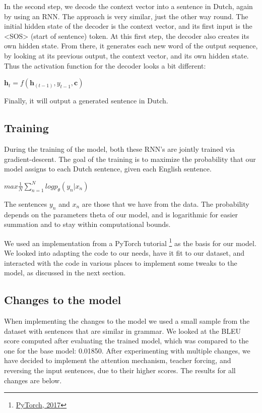 \documentclass[11pt]{article}
\begin{document}
In the second step, we decode the context vector into a sentence in Dutch, again by using an RNN. The approach is very similar, just the other way round. The initial hidden state of the decoder is the context vector, and its first input is the <SOS> (start of sentence) token. At this first step, the decoder also creates its own hidden state. From there, it generates each new word of the output sequence, by looking at its previous output, the context vector, and its own hidden state. Thus the activation function for the decoder looks a bit different: 
\begin{center}
    $\textbf{h}_t = f(\textbf{h}_{(t-1)},y_{t-1},\textbf{c})$
\end{center} 
Finally, it will output a generated sentence in Dutch.

\subsection{Training}
During the training of the model, both these RNN’s are jointly trained via gradient-descent. The goal of the training is to maximize the probability that our model assigns to each Dutch sentence, given each English sentence. 
\begin{center}
    $max \frac{1}{N} \sum_{n=1}^{N} logp_{\theta}(y_n|x_n)$
\end{center}
The sentences $y_{n}$ and $x_{n}$ are those that we have from the data. The probability depends on the parameters theta of our model, and is logarithmic for easier summation and to stay within computational bounds.

We used an implementation from a PyTorch tutorial \footnote[6]{\href{https://pytorch.org/tutorials/intermediate/seq2seq_translation_tutorial.html}{PyTorch, 2017}} as the basis for our model. We looked into adapting the code to our needs, have it fit to our dataset, and interacted with the code in various places to implement some tweaks to the model, as discussed in the next section.

\subsection{Changes to the model}
When implementing the changes to the model we used a small sample from the dataset with sentences that are similar in grammar. We looked at the BLEU score computed after evaluating the trained model, which was compared to the one for the base model: 0.01850. After experimenting with multiple changes, we have decided to implement the attention mechanism, teacher forcing, and reversing the input sentences, due to their higher scores.
The results for all changes are below.
\end{document}
